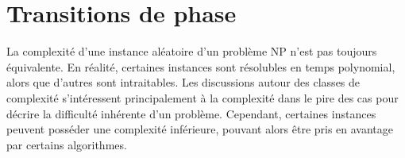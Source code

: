 


\section{Transitions de phase}
\label{sec:transitions-de-phase}

La complexité d'une instance aléatoire d'un problème \textsf{NP} n'est pas toujours équivalente. En réalité, certaines instances sont résolubles en temps polynomial, alors que d'autres sont intraitables. Les discussions autour des classes de complexité s'intéressent principalement à la complexité dans le pire des cas pour décrire la difficulté inhérente d'un problème. Cependant, certaines instances peuvent posséder une complexité inférieure, pouvant alors être pris en avantage par certains algorithmes. 

